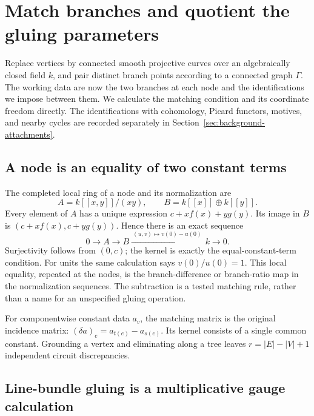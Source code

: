 \documentclass[11pt]{article}
\theoremstyle{definition}
\theoremstyle{remark}
\begin{document}
\section{Match branches and quotient the gluing parameters}
\label{sec:nodal-matching-calculus}

Replace vertices by connected smooth projective curves over an algebraically closed field $k$, and pair distinct branch points according to a connected graph $\Gamma$. The working data are now the two branches at each node and the identifications we impose between them. We calculate the matching condition and its coordinate freedom directly. The identifications with cohomology, Picard functors, motives, and nearby cycles are recorded separately in Section~\ref{sec:background-attachments}.

\subsection{A node is an equality of two constant terms}
\label{sec:branch-matching}

The completed local ring of a node and its normalization are
\[
 A=k[[x,y]]/(xy),\qquad B=k[[x]]\oplus k[[y]].
\]
Every element of $A$ has a unique expression $c+x f(x)+y g(y)$. Its image in $B$ is $(c+xf(x),c+yg(y))$. Hence there is an exact sequence
\[
 0\longrightarrow A\longrightarrow B
   \xrightarrow{\ (u,v)\mapsto v(0)-u(0)\ }k\longrightarrow0.
\]
Surjectivity follows from $(0,c)$; the kernel is exactly the equal-constant-term condition. For units the same calculation says $v(0)/u(0)=1$. This local equality, repeated at the nodes, is the branch-difference or branch-ratio map in the normalization sequences. The subtraction is a tested matching rule, rather than a name for an unspecified gluing operation.

For componentwise constant data $a_v$, the matching matrix is the original incidence matrix: $(\delta a)_e=a_{t(e)}-a_{s(e)}$. Its kernel consists of a single common constant. Grounding a vertex and eliminating along a tree leaves $r=|E|-|V|+1$ independent circuit discrepancies.

\subsection{Line-bundle gluing is a multiplicative gauge calculation}
\label{sec:line-bundle-gauge}
\end{document}
